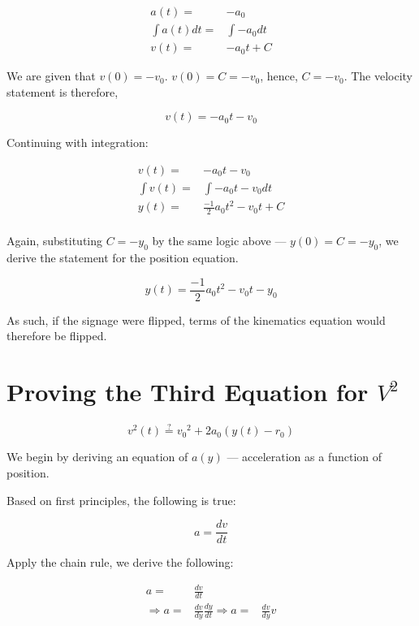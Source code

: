 \documentclass[letterpaper]{article}
\begin{document}
\begin{align}
    a(t) =& -a_0 \\
    \int a(t) dt =& \int -a_0 dt \\
    v(t) =& -a_0t + C 
\end{align}

We are given that \(v(0)=-v_0\). \(v(0) = C = -v_0\), hence, \(C=-v_0\). The velocity statement is therefore,

\begin{equation}
    v(t) = -a_0t-v_0
\end{equation}

Continuing with integration:

\begin{align}
    v(t) =& -a_0t - v_0 \\
    \int v(t) =& \int -a_0t - v_0 dt \\
    y(t) =& \frac{-1}{2}a_0t^2 - v_0t+C \\
\end{align}

Again, substituting \(C = -y_0\) by the same logic above --- \(y(0) = C = -y_0\), we derive the statement for the position equation.

\begin{equation}
    y(t) = \frac{-1}{2}a_0t^2 - v_0t - y_0
\end{equation}

As such, if the signage were flipped, terms of the kinematics equation would therefore be flipped.

\section{Proving the Third Equation for \(V^2\)}
\label{sec:orge9e861b}
\begin{equation}
    v^2(t) \stackrel{?}{=} {v_0}^2 + 2a_0(y(t)-r_0)
\end{equation}

We begin by deriving an equation of \(a(y)\) --- acceleration as a function of position.

Based on first principles, the following is true:

\begin{equation}
    a = \frac{dv}{dt}
\end{equation}

Apply the chain rule, we derive the following:

\begin{align}
    a =& \frac{dv}{dt} \\
    \Rightarrow a =& \frac{dv}{dy}\frac{dy}{dt}
    \Rightarrow a =& \frac{dv}{dy}v
\end{align}
\end{document}
